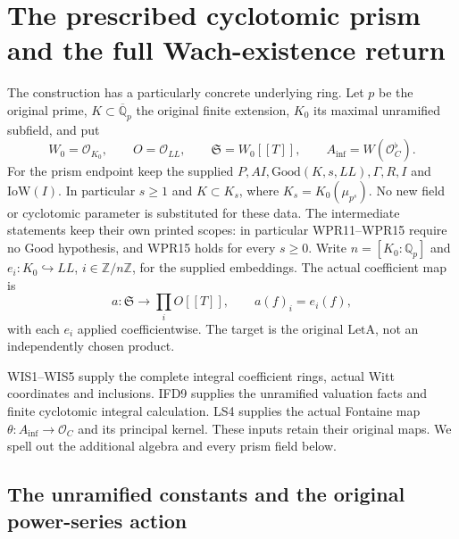 \section{The prescribed cyclotomic prism and the full Wach-existence return}
\label{sec:wach-prism-v056}


The construction has a particularly concrete underlying ring. Let
$p$ be the original prime, $K\subset\overline{\mathbb Q}_p$ the
original finite extension, $K_0$ its maximal unramified subfield,
and put
\[
 W_0=\mathcal O_{K_0},\qquad O=\mathcal O_{LL},\qquad
 \mathfrak S=W_0[[T]],\qquad A_{\mathrm{inf}}=W(\mathcal O_C^\flat).
 \tag{WPR.1}
\]
For the prism endpoint keep the supplied
$P,AI,\mathrm{Good}(K,s,LL),\Gamma,R,I$ and
$\mathrm{IoW}(I)$. In particular $s\geq1$ and $K\subset K_s$,
where $K_s=K_0(\mu_{p^s})$. No new field or cyclotomic parameter
is substituted for these data. The intermediate statements keep
their own printed scopes: in particular WPR11--WPR15 require
no $\mathrm{Good}$ hypothesis, and WPR15 holds for every $s\geq0$. Write $n=[K_0:\mathbb Q_p]$ and
$e_i:K_0\hookrightarrow LL$, $i\in\mathbb Z/n\mathbb Z$, for
the supplied embeddings. The actual coefficient map is
\[
 a:\mathfrak S\longrightarrow\prod_i O[[T]],\qquad
 a(f)_i=e_i(f),
 \tag{WPR.2}
\]
with each $e_i$ applied coefficientwise. The target is the original
$\mathrm{LetA}$, not an independently chosen product.

WIS1--WIS5 supply the complete integral coefficient rings, actual
Witt coordinates and inclusions. IFD9 supplies the unramified
valuation facts and finite cyclotomic integral calculation. LS4
supplies the actual Fontaine map $\theta:A_{\mathrm{inf}}\to\mathcal O_C$
and its principal kernel. These inputs retain their original maps.
We spell out the additional algebra and every prism field below.

\subsection{The unramified constants and the original power-series action}

